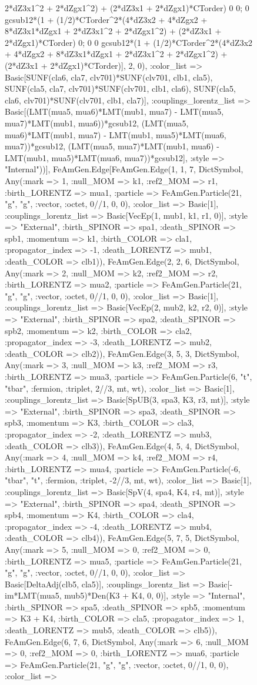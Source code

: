 \documentclass{revtex4}
\begin{document}
\begin{figure}[!htb]
\begin{center}
{2*dZ3x1^2 + 2*dZgx1^2) + (2*dZ3x1 + 2*dZgx1)*CTorder) 0 0; 0 gcsub12*(1 + (1/2)*CTorder^2*(4*dZ3x2 + 4*dZgx2 + 8*dZ3x1*dZgx1 + 2*dZ3x1^2 + 2*dZgx1^2) + (2*dZ3x1 + 2*dZgx1)*CTorder) 0; 0 0 gcsub12*(1 + (1/2)*CTorder^2*(4*dZ3x2 + 4*dZgx2 + 8*dZ3x1*dZgx1 + 2*dZ3x1^2 + 2*dZgx1^2) + (2*dZ3x1 + 2*dZgx1)*CTorder)], 2, 0), :color_list => Basic[SUNF(cla6, cla7, clv701)*SUNF(clv701, clb1, cla5), SUNF(cla5, cla7, clv701)*SUNF(clv701, clb1, cla6), SUNF(cla5, cla6, clv701)*SUNF(clv701, clb1, cla7)], :couplings_lorentz_list => Basic[(LMT(mua5, mua6)*LMT(mub1, mua7) - LMT(mua5, mua7)*LMT(mub1, mua6))*gcsub12, (LMT(mua5, mua6)*LMT(mub1, mua7) - LMT(mub1, mua5)*LMT(mua6, mua7))*gcsub12, (LMT(mua5, mua7)*LMT(mub1, mua6) - LMT(mub1, mua5)*LMT(mua6, mua7))*gcsub12], :style => "Internal"))], FeAmGen.Edge[FeAmGen.Edge(1, 1, 7, Dict{Symbol, Any}(:mark => 1, :null_MOM => k1, :ref2_MOM => r1, :birth_LORENTZ => mua1, :particle => FeAmGen.Particle(21, "g", "g", :vector, :octet, 0//1, 0, 0), :color_list => Basic[1], :couplings_lorentz_list => Basic[VecEp(1, mub1, k1, r1, 0)], :style => "External", :birth_SPINOR => spa1, :death_SPINOR => spb1, :momentum => k1, :birth_COLOR => cla1, :propagator_index => -1, :death_LORENTZ => mub1, :death_COLOR => clb1)), FeAmGen.Edge(2, 2, 6, Dict{Symbol, Any}(:mark => 2, :null_MOM => k2, :ref2_MOM => r2, :birth_LORENTZ => mua2, :particle => FeAmGen.Particle(21, "g", "g", :vector, :octet, 0//1, 0, 0), :color_list => Basic[1], :couplings_lorentz_list => Basic[VecEp(2, mub2, k2, r2, 0)], :style => "External", :birth_SPINOR => spa2, :death_SPINOR => spb2, :momentum => k2, :birth_COLOR => cla2, :propagator_index => -3, :death_LORENTZ => mub2, :death_COLOR => clb2)), FeAmGen.Edge(3, 5, 3, Dict{Symbol, Any}(:mark => 3, :null_MOM => k3, :ref2_MOM => r3, :birth_LORENTZ => mua3, :particle => FeAmGen.Particle(6, "t", "tbar", :fermion, :triplet, 2//3, mt, wt), :color_list => Basic[1], :couplings_lorentz_list => Basic[SpUB(3, spa3, K3, r3, mt)], :style => "External", :birth_SPINOR => spa3, :death_SPINOR => spb3, :momentum => K3, :birth_COLOR => cla3, :propagator_index => -2, :death_LORENTZ => mub3, :death_COLOR => clb3)), FeAmGen.Edge(4, 5, 4, Dict{Symbol, Any}(:mark => 4, :null_MOM => k4, :ref2_MOM => r4, :birth_LORENTZ => mua4, :particle => FeAmGen.Particle(-6, "tbar", "t", :fermion, :triplet, -2//3, mt, wt), :color_list => Basic[1], :couplings_lorentz_list => Basic[SpV(4, spa4, K4, r4, mt)], :style => "External", :birth_SPINOR => spa4, :death_SPINOR => spb4, :momentum => K4, :birth_COLOR => cla4, :propagator_index => -4, :death_LORENTZ => mub4, :death_COLOR => clb4)), FeAmGen.Edge(5, 7, 5, Dict{Symbol, Any}(:mark => 5, :null_MOM => 0, :ref2_MOM => 0, :birth_LORENTZ => mua5, :particle => FeAmGen.Particle(21, "g", "g", :vector, :octet, 0//1, 0, 0), :color_list => Basic[DeltaAdj(clb5, cla5)], :couplings_lorentz_list => Basic[-im*LMT(mua5, mub5)*Den(K3 + K4, 0, 0)], :style => "Internal", :birth_SPINOR => spa5, :death_SPINOR => spb5, :momentum => K3 + K4, :birth_COLOR => cla5, :propagator_index => 1, :death_LORENTZ => mub5, :death_COLOR => clb5)), FeAmGen.Edge(6, 7, 6, Dict{Symbol, Any}(:mark => 6, :null_MOM => 0, :ref2_MOM => 0, :birth_LORENTZ => mua6, :particle => FeAmGen.Particle(21, "g", "g", :vector, :octet, 0//1, 0, 0), :color_list => }
\end{center}
\end{figure}
\end{document}
